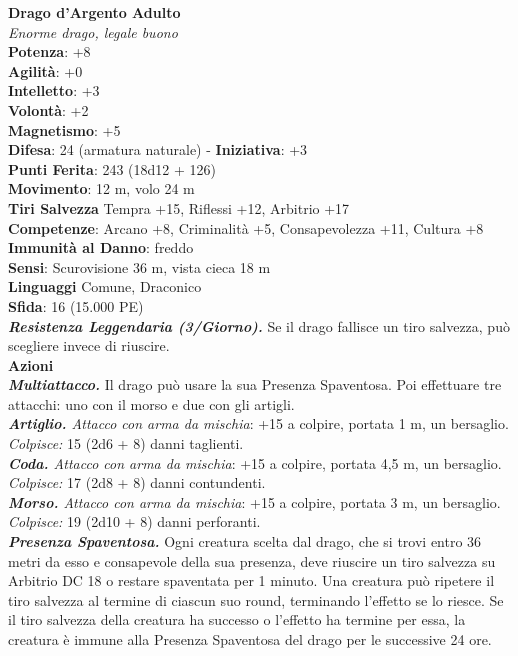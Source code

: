 \begin{multicols}{2}
\medskip\textbf{Drago d'Argento Adulto}\\
\emph{Enorme drago, legale buono}\\
\textbf{Potenza}: +8\\
\textbf{Agilità}: +0\\
\textbf{Intelletto}: +3\\
\textbf{Volontà}: +2\\
\textbf{Magnetismo}: +5\\
\textbf{Difesa}: 24 (armatura naturale) - \textbf{Iniziativa}: +3\\
\textbf{Punti Ferita}: 243 (18d12 + 126)\\
\textbf{Movimento}: 12 m, volo 24 m\\
\textbf{Tiri Salvezza} Tempra +15, Riflessi +12, Arbitrio +17\\
\textbf{Competenze}: Arcano +8, Criminalità +5, Consapevolezza +11, Cultura +8\\
\textbf{Immunità al Danno}: freddo\\
\textbf{Sensi}: Scurovisione 36 m, vista cieca 18 m\\
\textbf{Linguaggi} Comune, Draconico\\
\textbf{Sfida}: 16 (15.000 PE)\smallskip\\
\emph{\textbf{Resistenza Leggendaria (3/Giorno).}} Se il drago fallisce un tiro salvezza, può scegliere invece di riuscire.\\
\smallskip\textbf{Azioni}\\
\emph{\textbf{Multiattacco.}} Il drago può usare la sua Presenza Spaventosa. Poi effettuare tre attacchi: uno con il morso e due con gli artigli.\\
\emph{\textbf{Artiglio.} Attacco con arma da mischia}: +15 a colpire, portata 1 m, un bersaglio.\\
\emph{Colpisce:} 15 (2d6 + 8) danni taglienti.\\
\emph{\textbf{Coda.} Attacco con arma da mischia}: +15 a colpire, portata 4,5 m, un bersaglio.\\
\emph{Colpisce:} 17 (2d8 + 8) danni contundenti.\\
\emph{\textbf{Morso.} Attacco con arma da mischia}: +15 a colpire, portata 3 m, un bersaglio.\\
\emph{Colpisce:} 19 (2d10 + 8) danni perforanti.\\
\emph{\textbf{Presenza Spaventosa.}} Ogni creatura scelta dal drago, che si trovi entro 36 metri da esso e consapevole della sua presenza, deve riuscire un tiro salvezza su Arbitrio DC 18 o restare spaventata per 1 minuto. Una creatura può ripetere il tiro salvezza al termine di ciascun suo round, terminando l'effetto se lo riesce. Se il tiro salvezza della creatura ha successo o l'effetto ha termine per essa, la creatura è immune alla Presenza Spaventosa del drago per le successive 24 ore.\\

\end{multicols}
